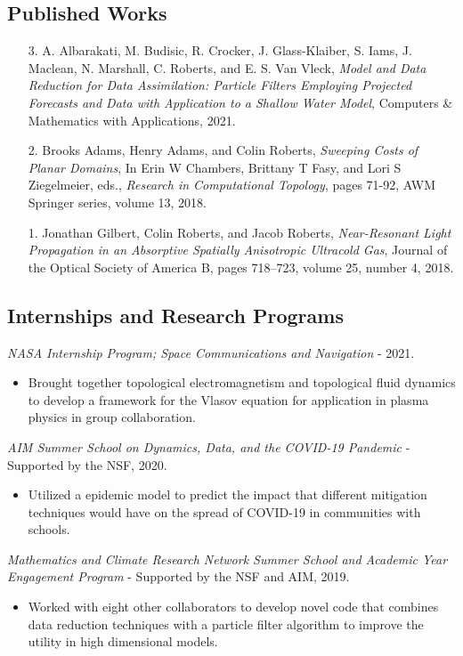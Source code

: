 \documentclass[12pt]{article} %
\begin{document}
\subsection{Published Works}
\begin{flushleft}
\begin{itemize}[leftmargin=*]
    \item[3.] A. Albarakati, M. Budisic, R. Crocker, J. Glass-Klaiber, S. Iams, J. Maclean, N. Marshall, C. Roberts,
and E. S. Van Vleck, \textit{Model and Data Reduction for Data Assimilation: Particle Filters Employing
Projected Forecasts and Data with Application to a Shallow Water Model}, Computers \& Mathematics with Applications, 2021.

    \item[2.] Brooks Adams, Henry Adams, and Colin Roberts, \textit{Sweeping Costs of Planar Domains}, In Erin W Chambers, Brittany T Fasy, and Lori S Ziegelmeier, eds., \emph{Research in Computational Topology}, pages 71-92, AWM Springer series, volume 13, 2018.

    \item[1.] Jonathan Gilbert, Colin Roberts, and Jacob Roberts, \textit{Near-Resonant Light Propagation in an Absorptive Spatially Anisotropic Ultracold Gas}, Journal of the Optical Society of America B, pages 718–723, volume 25, number 4, 2018.
\end{itemize}
\end{flushleft}

\subsection{Internships and Research Programs}
\begin{flushleft}
    \emph{NASA Internship Program; Space Communications and Navigation} - 2021.
\begin{itemize}
	\item Brought together topological electromagnetism and topological fluid dynamics to develop a framework for the Vlasov equation for application in plasma physics in group collaboration.
\end{itemize}
\vspace*{5pt}
    \emph{AIM Summer School on Dynamics, Data, and the COVID-19 Pandemic} - Supported by the NSF, 2020.
\begin{itemize}
	\item Utilized a epidemic model to predict the impact that different mitigation techniques would have on the spread of COVID-19 in communities with schools.
\end{itemize}
\vspace*{5pt}
    \emph{Mathematics and Climate Research Network Summer School and Academic Year Engagement Program} - Supported by the NSF and AIM, 2019.
\begin{itemize}
	\item Worked with eight other collaborators to develop novel code that combines data reduction techniques with a particle filter algorithm to improve the utility in high dimensional models.
\end{itemize}
\end{flushleft}
\end{document}
